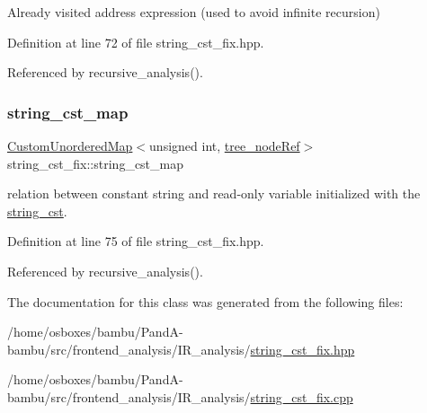 Already visited address expression (used to avoid infinite recursion) 



Definition at line 72 of file string\+\_\+cst\+\_\+fix.\+hpp.



Referenced by recursive\+\_\+analysis().

\mbox{\label{classstring__cst__fix_a4c1ab9ed1cb2b96a5bc6f0821b42ef08}} 
\subsubsection{\texorpdfstring{string\+\_\+cst\+\_\+map}{string\_cst\_map}}
{\footnotesize\ttfamily \hyperlink{custom__map_8hpp_ad1ed68f2ff093683ab1a33522b144adc}{Custom\+Unordered\+Map}$<$unsigned int, \hyperlink{tree__node_8hpp_a6ee377554d1c4871ad66a337eaa67fd5}{tree\+\_\+node\+Ref}$>$ string\+\_\+cst\+\_\+fix\+::string\+\_\+cst\+\_\+map\hspace{0.3cm}{\ttfamily [protected]}}



relation between constant string and read-\/only variable initialized with the \hyperlink{structstring__cst}{string\+\_\+cst}. 



Definition at line 75 of file string\+\_\+cst\+\_\+fix.\+hpp.



Referenced by recursive\+\_\+analysis().



The documentation for this class was generated from the following files\+:\begin{DoxyCompactItemize}
\item 
/home/osboxes/bambu/\+Pand\+A-\/bambu/src/frontend\+\_\+analysis/\+I\+R\+\_\+analysis/\hyperlink{string__cst__fix_8hpp}{string\+\_\+cst\+\_\+fix.\+hpp}\item 
/home/osboxes/bambu/\+Pand\+A-\/bambu/src/frontend\+\_\+analysis/\+I\+R\+\_\+analysis/\hyperlink{string__cst__fix_8cpp}{string\+\_\+cst\+\_\+fix.\+cpp}\end{DoxyCompactItemize}
